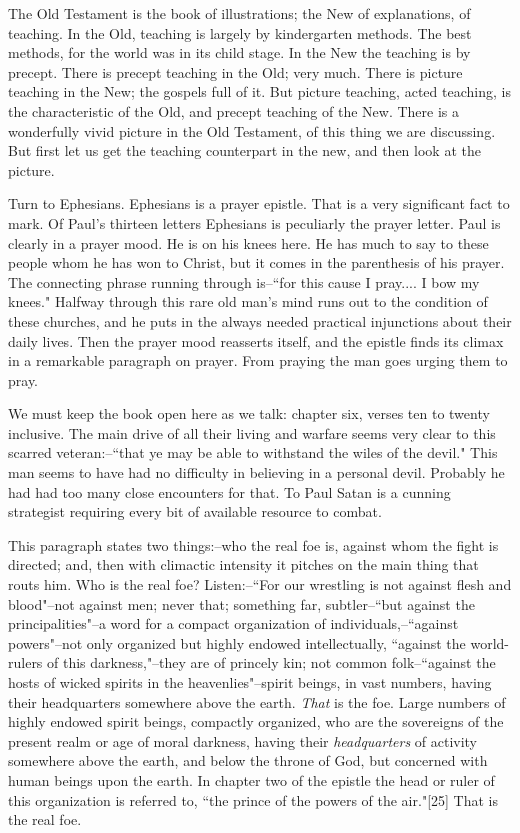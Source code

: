 The Old Testament is the book of illustrations; the New of explanations,
of teaching. In the Old, teaching is largely by kindergarten methods. The
best methods, for the world was in its child stage. In the New the
teaching is by precept. There is precept teaching in the Old; very much.
There is picture teaching in the New; the gospels full of it. But picture
teaching, acted teaching, is the characteristic of the Old, and precept
teaching of the New. There is a wonderfully vivid picture in the Old
Testament, of this thing we are discussing. But first let us get the
teaching counterpart in the new, and then look at the picture.

Turn to Ephesians. Ephesians is a prayer epistle. That is a very
significant fact to mark. Of Paul's thirteen letters Ephesians is
peculiarly the prayer letter. Paul is clearly in a prayer mood. He is on
his knees here. He has much to say to these people whom he has won to
Christ, but it comes in the parenthesis of his prayer. The connecting
phrase running through is--``for this cause I pray.... I bow my knees."
Halfway through this rare old man's mind runs out to the condition of
these churches, and he puts in the always needed practical injunctions
about their daily lives. Then the prayer mood reasserts itself, and the
epistle finds its climax in a remarkable paragraph on prayer. From praying
the man goes urging them to pray.

We must keep the book open here as we talk: chapter six, verses ten to
twenty inclusive. The main drive of all their living and warfare seems
very clear to this scarred veteran:--``that ye may be able to withstand the
wiles of the devil." This man seems to have had no difficulty in believing
in a personal devil. Probably he had had too many close encounters for
that. To Paul Satan is a cunning strategist requiring every bit of
available resource to combat.

This paragraph states two things:--who the real foe is, against whom the
fight is directed; and, then with climactic intensity it pitches on the
main thing that routs him. Who is the real foe? Listen:--``For our
wrestling is not against flesh and blood"--not against men; never that;
something far, subtler--``but against the principalities"--a word for a
compact organization of individuals,--``against powers"--not only organized
but highly endowed intellectually, ``against the world-rulers of this
darkness,"--they are of princely kin; not common folk--``against the hosts
of wicked spirits in the heavenlies"--spirit beings, in vast numbers,
having their headquarters somewhere above the earth. \textit{That} is the foe.
Large numbers of highly endowed spirit beings, compactly organized, who
are the sovereigns of the present realm or age of moral darkness, having
their \textit{headquarters} of activity somewhere above the earth, and below the
throne of God, but concerned with human beings upon the earth. In chapter
two of the epistle the head or ruler of this organization is referred to,
``the prince of the powers of the air."[25] That is the real foe.

